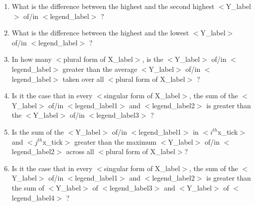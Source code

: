 \documentclass[10pt,twocolumn,letterpaper]{article}
\begin{document}
\begin{enumerate}
\begin{enumerate}[1.]
        \item What is the difference between the highest and the second highest $<$Y\_label$>$ of/in $<$legend\_label$>$ ?
        \item What is the difference between the highest and the lowest $<$Y\_label$>$ of/in $<$legend\_label$>$ ?
        \item In how many $<$plural form of X\_label$>$, is the $<$Y\_label$>$ of/in $<$legend\_label$>$ greater than the average $<$Y\_label$>$ of/in $<$legend\_label$>$ taken over all $<$plural form of X\_label$>$ ?
        \item Is it the case that in every $<$singular form of X\_label$>$, the sum of the $<$Y\_label$>$ of/in $<$legend\_label1$>$ and $<$legend\_label2$>$ is greater than the $<$Y\_label$>$ of/in $<$legend\_label3$>$ ?
        \item Is the sum of the $<$Y\_label$>$ of/in $<$legend\_label1$>$ in $<i^{th}$x\_tick$>$ and $<j^{th}$x\_tick$>$ greater than the maximum $<$Y\_label$>$ of/in $<$legend\_label2$>$ across all $<$plural form of X\_label$>$?
        \item Is it the case that in every $<$singular form of X\_label$>$, the sum of the $<$Y\_label$>$ of/in $<$legend\_label1$>$ and $<$legend\_label2$>$ is greater than the sum of $<$Y\_label$>$ of $<$legend\_label3$>$ and $<$Y\_label$>$ of $<$legend\_label4$>$ ?
    \end{enumerate}
    
\end{enumerate}
\end{document}
